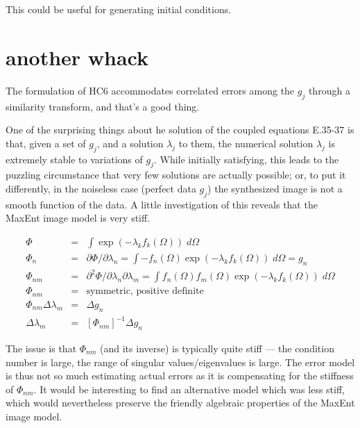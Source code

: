 \documentclass[12pt]{book}
\begin{document}
This could be useful for generating initial conditions.

\section{another whack}

The formulation of HC6 accommodates correlated errors among the $g_j$ through a similarity transform, and 
that's a good thing.

One of the surprising things about he solution of the coupled equations E.35-37 is that, given a set of $g_j$, and 
a solution $\lambda_j$ to them, the numerical solution $\lambda_j$ is extremely stable to variations of $g_j$.  
While initially satisfying, this leads to the puzzling circumstance that very few solutions are actually possible; or, to 
put it differently, in the noiseless case (perfect data $g_j$) the synthesized image is not a smooth function of the 
data.  A little investigation of this reveals that the MaxEnt image model is very stiff.  

\begin{eqnarray}
\Phi &=& \int \exp(-\lambda_k f_k(\Omega)) \;d\Omega \\
\Phi_n &=& \partial \Phi/\partial \lambda_n = \int -f_n(\Omega) \exp(-\lambda_k f_k(\Omega)) \;d\Omega = g_n \\
\Phi_{nm} &=& \partial^2 \Phi/\partial \lambda_n \partial \lambda_m = \int f_n(\Omega) f_m(\Omega) 
\exp(-\lambda_k f_k(\Omega)) \;d\Omega \\
\Phi_{nm} &=& \textrm{symmetric, positive definite} \nonumber \\
\Phi_{nm} \Delta \lambda_m &=& \Delta g_n \\
\Delta \lambda_m &=& [\Phi_{nm}]^{-1} \Delta g_n
\end{eqnarray}

The issue is that $\Phi_{nm}$ (and its inverse) is typically quite stiff --- the condition number is large, the range of
singular values/eigenvalues is large.  The error model is thus not so much estimating actual errors as it is 
compensating for the stiffness of $\Phi_{nm}$.  It would be interesting to find an alternative model which was less 
stiff, which would nevertheless preserve the friendly algebraic properties of the MaxEnt image model.
\end{document}
